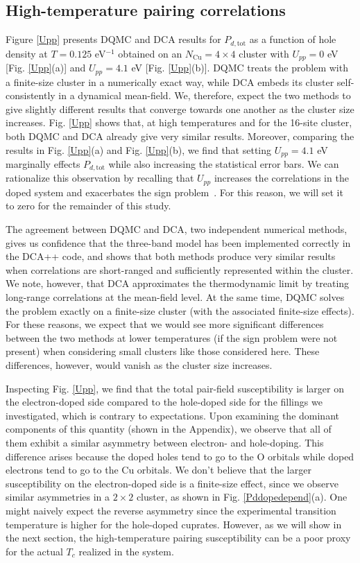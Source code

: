 \documentclass[reprint,nofootinbib,nobibnotes,amsmath,amssymb,aps,prb,floatfix]{revtex4-2}
\newcommand{\figdisp}[1]{Fig. \ref{#1}}
\begin{document}
\subsection{High-temperature pairing correlations} 
Figure \ref{Upp} presents DQMC and DCA results for $P_{d,\text{tot}}$ 
as a function of hole density at $T=0.125$ eV$^{-1}$ obtained on an $N_{\textrm{Cu}}=4\times4$ cluster with $U_{pp}=0$ eV [\figdisp{Upp}(a)] and $U_{pp}=4.1$ eV [\figdisp{Upp}(b)]. 
DQMC treats the problem with a finite-size cluster in a numerically exact way, while DCA embeds its cluster self-consistently in a dynamical mean-field. We, therefore, expect the two methods to give slightly different results that converge towards one another as the cluster size increases. 
Fig. \ref{Upp} shows that, at high temperatures and for the 16-site cluster, both DQMC and DCA already give very similar results. Moreover, comparing the results in \figdisp{Upp}(a) and \figdisp{Upp}(b), we find that setting $U_{pp}=4.1$ eV marginally effects $P_{d,\text{tot}}$ while also increasing the statistical error bars. We can rationalize this observation by recalling that $U_{pp}$ increases the correlations in the doped system and exacerbates the sign problem~\cite{Kung}. For this reason, we will set it to zero for the remainder of this study. 

The agreement between DQMC and DCA, two independent numerical methods, gives us confidence that the three-band model has been implemented correctly in the DCA++ code, and shows that both methods produce very similar results when correlations are short-ranged and sufficiently represented within the cluster. We note, however, that DCA approximates the thermodynamic limit by treating long-range correlations at the mean-field level. At the same time, DQMC solves the problem exactly on a finite-size cluster (with the associated finite-size effects). For these reasons, we expect that we would see more significant differences between the two methods at lower temperatures (if the sign problem were not present) when considering small clusters like those considered here. These differences, however, would vanish as the cluster size increases.

Inspecting \figdisp{Upp}, we find that the total pair-field susceptibility is larger on the electron-doped side compared to the hole-doped side for the fillings we investigated, which is contrary to expectations. Upon examining the dominant components of this quantity (shown in the Appendix), we observe that all of them exhibit a similar asymmetry between electron- and hole-doping. This difference arises because the doped holes tend to go to the O orbitals while doped electrons tend to go to the Cu orbitals. We don't believe that the larger susceptibility on the electron-doped side is a finite-size effect, since we observe similar asymmetries in a $2\times2$ cluster, as shown in \figdisp{Pddopedepend}(a). One might naively expect the reverse asymmetry since the experimental transition temperature is higher for the hole-doped cuprates. However, as we will show in the next section, the high-temperature pairing susceptibility can be a poor proxy for the actual $T_c$ realized in the system. 
\end{document}
